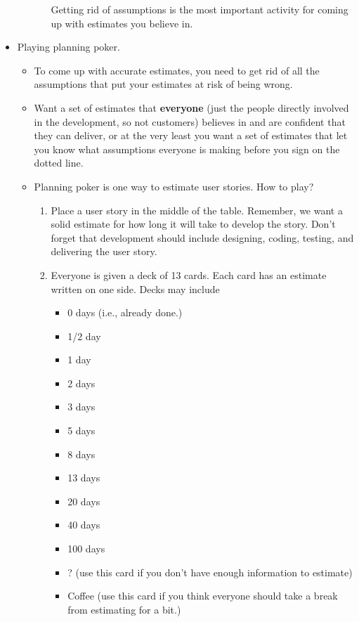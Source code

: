 \documentclass[letterpaper]{article}
\begin{document}
\begin{itemize}
\begin{itemize}
\begin{itemize}
            \begin{mdframed}
                Getting rid of assumptions is the most important activity for coming up with estimates you believe in.
            \end{mdframed}
        \end{itemize}
    \end{itemize}

    \item Playing planning poker. 
    \begin{itemize}
        \item To come up with accurate estimates, you need to get rid of all the assumptions that put your estimates at risk of being wrong. 
        \item Want a set of estimates that \textbf{everyone} (just the people directly involved in the development, so not customers) believes in and are confident that they can deliver, or at the very least you want a set of estimates that let you know what assumptions everyone is making before you sign on the dotted line. 
        \item Planning poker is one way to estimate user stories. How to play?  
        \begin{enumerate}
            \item Place a user story in the middle of the table. Remember, we want a solid estimate for how long it will take to develop the story. Don't forget that development should include designing, coding, testing, and delivering the user story. 
            \item Everyone is given a deck of 13 cards. Each card has an estimate written on one side. Decks may include 
            \begin{itemize}
                \item 0 days (i.e., already done.)
                \item 1/2 day 
                \item 1 day 
                \item 2 days 
                \item 3 days 
                \item 5 days 
                \item 8 days 
                \item 13 days 
                \item 20 days 
                \item 40 days 
                \item 100 days 
                \item ? (use this card if you don't have enough information to estimate)
                \item Coffee (use this card if you think everyone should take a break from estimating for a bit.)
            \end{itemize}


\end{enumerate}
\end{itemize}
\end{itemize}
\end{document}
